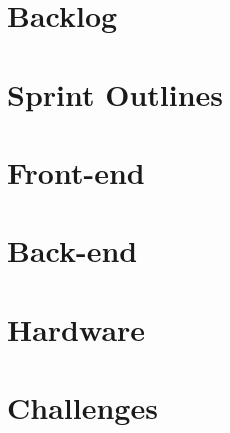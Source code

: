\section{Backlog}


\section{Sprint Outlines}


\section{Front-end}


\section{Back-end}


\section{Hardware}


\section{Challenges}